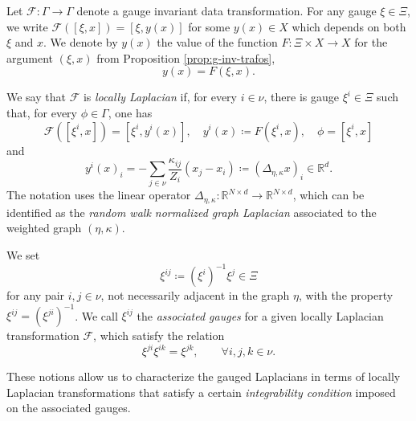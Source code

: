 \documentclass[10pt,reqno]{amsart}
\numberwithin{equation}{section}
\theoremstyle{bfnote}
\theoremstyle{bfdef}
\newcommand{\mc}[1]{\mathcal{#1}}
\newcommand{\R}{\mathbb{R}}
\begin{document}
	Let $\mc{F} : \Gamma \to \Gamma$ denote a gauge invariant data transformation. For any gauge $\xi \in \Xi$, we write $\mc{F}([\xi,x]) = [\xi,y(x)]$ for some $y(x) \in X$ which depends on both $\xi$ and $x$. We denote by $y(x)$ the value of the function $F: \Xi \times X \to X$ for the argument $(\xi,x)$ from Proposition \ref{prop:g-inv-trafos},
	\begin{equation}\label{eq:y-by-F}
		y(x) = F(\xi,x).
	\end{equation}

	We say that $\mc{F}$ is \textit{locally Laplacian} if, for every $i \in \nu$, there is gauge $\xi^{i} \in \Xi$ such that, for every $\phi \in \Gamma$, one has
	\begin{equation}\label{eq:def-yi}
		\mc{F}([\xi^{i},x]) = [\xi^{i},y^{i}(x)], \quad y^{i}(x) \coloneq F(\xi^{i},x), \quad \phi = [\xi^{i},x]
	\end{equation}
	and
	\begin{equation}\label{eq:def-y-diag}
		y^{i}(x)_{i} = -\sum_{j \in \nu} \frac{\kappa_{ij}}{Z_{i}}(x_{j} - x_{i}) \coloneq (\Delta_{\eta,\kappa} x)_{i} \in \R^{d}.
	\end{equation}
	The notation uses the linear operator $\Delta_{\eta,\kappa}: \R^{N \times d} \to \R^{N \times d}$, which can be identified as the \textit{random walk normalized graph Laplacian} \cite{hein2007graph} associated to the weighted graph $(\eta,\kappa)$.

	We set
	\begin{equation}\label{eq:ass-g}
		\xi^{ij} \coloneq (\xi^{i})^{-1} \xi^{j} \in \Xi
	\end{equation}
	for any pair $i,j \in \nu$, not necessarily adjacent in the graph $\eta$, with the property $\xi^{ij} = (\xi^{ji})^{-1}$. We call $\xi^{ij}$ the \textit{associated gauges} for a given locally Laplacian transformation $\mc{F}$, which satisfy the relation
	\begin{equation}
		\xi^{ji}\xi^{ik} = \xi^{jk}, \qquad \forall i,j,k \in \nu.
	\end{equation}

	These notions allow us to characterize the gauged Laplacians in terms of locally Laplacian transformations that satisfy a certain \textit{integrability condition} imposed on the associated gauges.
\end{document}
